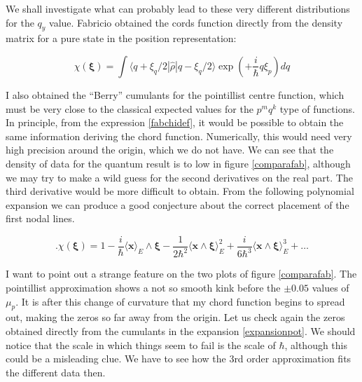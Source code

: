 \documentclass[a4paper,12pt]{article}
\newcommand{\ihb}{\frac{i}{\hbar}}
\newcommand{\xfase}{\mathbf{x}}
\newcommand{\xifase}{ {\boldsymbol{\xi}} }
\newcommand{\bra}[1]{\langle #1|}
\newcommand{\ket}[1]{|#1\rangle}
\newcommand{\Prom}[2]{\langle #1\rangle_{#2}}
\begin{document}
We shall investigate what can probably lead to these very different
distributions for the $q_y$ value. Fabricio obtained the cords function
directly from the density matrix for a pure state in the position representation:

\begin{equation}\label{fabchidef}
\chi(\xifase)=\int \bra{q+\xi_q/2}\hat{\rho}\ket{q-\xi_q/2}\exp (+\ihb q \xi_p) d q
\end{equation}

I also obtained the ``Berry'' cumulants for the pointillist centre function, which
must be very close to the classical expected values for the $p^m q^k$  type of
functions. In principle, from the expression \ref{fabchidef}, it would be possible
to obtain the same information deriving the chord function. Numerically, this would
need very high precision around the origin, which we do not have. We can see
that the density of data for the quantum result is to low in figure \ref{comparafab},
although we may try to make a wild guess for the second derivatives
on the real part. The third derivative would be more difficult to obtain.
From the following polynomial expansion we can produce a good conjecture
about the correct placement of the first nodal lines.

\begin{equation} \label{expansionpot}.
\chi(\xifase)=1-\ihb \Prom{\xfase}{E}\wedge\xifase
-\frac{1}{2 \hbar^2}\Prom{\xfase\wedge\xifase}{E}^2
+\frac{i}{6 \hbar^3 }\Prom{\xfase\wedge\xifase}{E}^3+\ldots
\end{equation} 

I want to point out a strange feature on the two plots of figure \ref{comparafab}.
The pointillist approximation shows a not so smooth kink before the $\pm 0.05$ values
of $\mu_p$. It is after this change of curvature that my chord function
begins to spread out, making the zeros so far away from the origin. Let us check again
the zeros obtained directly from the cumulants in the expansion \ref{expansionpot}.
We should notice that the scale in which things seem to fail is the scale of $\hbar$,
although this could be a misleading clue. We have to see how the
3rd order approximation fits the different data then.
\end{document}
